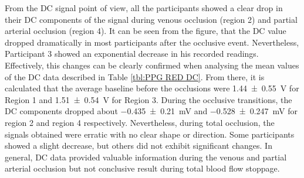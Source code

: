From the DC signal point of view, all the participants showed a clear drop in their DC components of the signal during venous occlusion (region 2) and partial arterial occlusion (region 4). It can be seen from the figure, that the DC value dropped dramatically in most participants after the occlusive event. Nevertheless, Participant 3 showed an exponential decrease in his recorded readings. Effectively, this changes can be clearly confirmed when analysing the mean values of the DC data described in Table \ref{tbl:PPG RED DC}. From there, it is calculated that the average baseline before the occlusions were \SI{1.44(055)}{\volt} for Region 1 and \SI{1.51(054)}{\volt} for Region 3. During the occlusive transitions, the DC components dropped about \SI{-0.435(0210)}{\milli\volt} and \SI{-0.528(0247)}{\milli\volt} for region 2 and region 4 respectively. Nevertheless, during total occlusion, the signals obtained were erratic with no clear shape or direction. Some participants showed a slight decrease, but others did not exhibit significant changes. In general, DC data provided valuable information during the venous and partial arterial occlusion but not conclusive result during total blood flow stoppage. 

